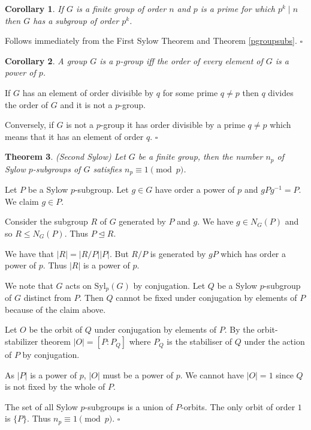 \documentclass[10pt]{article}
\newtheorem{theorem}{Theorem}[section]
\newtheorem{corollary}[theorem]{Corollary}
\newenvironment{proof}[1][Proof]{\begin{trivlist}
\item[\hskip \labelsep {\itshape #1}]}{\end{trivlist}}
\begin{document}
\begin{corollary}
If $G$ is a finite group of order $n$ and $p$ is a prime for which $p^k \;|\; n$ then $G$ has a subgroup of order $p^k$.
\end{corollary}

\begin{proof}
Follows immediately from the First Sylow Theorem and Theorem \ref{pgroupsubs}. $\square$
\end{proof}

\begin{corollary}
A group $G$ is a $p$-group iff the order of every element of $G$ is a power of $p$.
\end{corollary}

\begin{proof}
If $G$ has an element of order divisible by $q$ for some prime $q \neq p$ then $q$ divides the order of $G$ and it is not a $p$-group.

Conversely, if $G$ is not a $p$-group it has order divisible by a prime $q \neq p$ which means that it has an element of order $q$. $\square$
\end{proof}

\begin{theorem} (Second Sylow)
Let $G$ be a finite group, then the number $n_p$ of Sylow $p$-subgroups of $G$ satisfies $n_p \equiv 1 \pmod{p}$.
\end{theorem}

\begin{proof}
Let $P$ be a Sylow $p$-subgroup. Let $g \in G$ have order a power of $p$ and $gPg^{-1} = P$. We claim $g \in P$. 

Consider the subgroup $R$ of $G$ generated by $P$ and $g$. We have $g \in N_G(P)$ and so $R \leq N_G(P)$. Thus $P \mathrel{\unlhd} R$.

We have that $|R| = |R/P||P|$. But $R/P$ is generated by $gP$ which has order a power of $p$. Thus $|R|$ is a power of $p$.

We note that $G$ acts on Syl$_p(G)$ by conjugation. Let $Q$ be a Sylow $p$-subgroup of $G$ distinct from $P$. Then $Q$ cannot be fixed under conjugation by elements of $P$ because of the claim above.

Let $O$ be the orbit of $Q$ under conjugation by elements of $P$. By the orbit-stabilizer theorem $|O| = [P:P_Q]$ where $P_Q$ is the stabiliser of $Q$ under the action of $P$ by conjugation.

As $|P|$ is a power of $p$, $|O|$ must be a power of $p$. We cannot have $|O| = 1$ since $Q$ is not fixed by the whole of $P$.

The set of all Sylow $p$-subgroups is a union of $P$-orbits. The only orbit of order $1$ is $\{P\}$. Thus $n_p \equiv 1 \pmod{p}$. $\square$
\end{proof}
\end{document}
